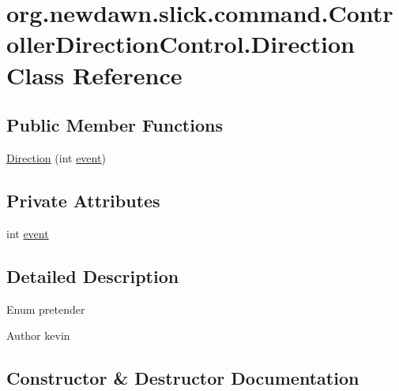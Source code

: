 \hypertarget{classorg_1_1newdawn_1_1slick_1_1command_1_1_controller_direction_control_1_1_direction}{}\section{org.\+newdawn.\+slick.\+command.\+Controller\+Direction\+Control.\+Direction Class Reference}
\label{classorg_1_1newdawn_1_1slick_1_1command_1_1_controller_direction_control_1_1_direction}
\subsection*{Public Member Functions}
\begin{DoxyCompactItemize}
\item 
\mbox{\hyperlink{classorg_1_1newdawn_1_1slick_1_1command_1_1_controller_direction_control_1_1_direction_ab4b5ccaa7942edfc8ded740ab1c878d1}{Direction}} (int \mbox{\hyperlink{classorg_1_1newdawn_1_1slick_1_1command_1_1_controller_direction_control_1_1_direction_aaa18d419563e506bd39f1d6d48d5b3f8}{event}})
\end{DoxyCompactItemize}
\subsection*{Private Attributes}
\begin{DoxyCompactItemize}
\item 
int \mbox{\hyperlink{classorg_1_1newdawn_1_1slick_1_1command_1_1_controller_direction_control_1_1_direction_aaa18d419563e506bd39f1d6d48d5b3f8}{event}}
\end{DoxyCompactItemize}


\subsection{Detailed Description}
Enum pretender

\begin{DoxyAuthor}{Author}
kevin 
\end{DoxyAuthor}


\subsection{Constructor \& Destructor Documentation}
\mbox{\label{classorg_1_1newdawn_1_1slick_1_1command_1_1_controller_direction_control_1_1_direction_ab4b5ccaa7942edfc8ded740ab1c878d1}} 
